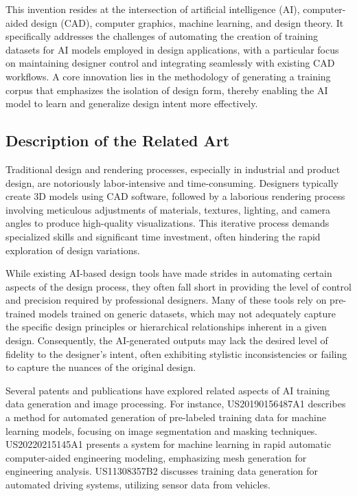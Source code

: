 \documentclass{article}
\begin{document}
This invention resides at the intersection of artificial intelligence (AI), computer-aided design (CAD), computer graphics, machine learning, and design theory. It specifically addresses the challenges of automating the creation of training datasets for AI models employed in design applications, with a particular focus on maintaining designer control and integrating seamlessly with existing CAD workflows. A core innovation lies in the methodology of generating a training corpus that emphasizes the isolation of design form, thereby enabling the AI model to learn and generalize design intent more effectively.



\subsection{Description of the Related Art}

Traditional design and rendering processes, especially in industrial and product design, are notoriously labor-intensive and time-consuming. Designers typically create 3D models using CAD software, followed by a laborious rendering process involving meticulous adjustments of materials, textures, lighting, and camera angles to produce high-quality visualizations. This iterative process demands specialized skills and significant time investment, often hindering the rapid exploration of design variations.

While existing AI-based design tools have made strides in automating certain aspects of the design process, they often fall short in providing the level of control and precision required by professional designers. Many of these tools rely on pre-trained models trained on generic datasets, which may not adequately capture the specific design principles or hierarchical relationships inherent in a given design. Consequently, the AI-generated outputs may lack the desired level of fidelity to the designer's intent, often exhibiting stylistic inconsistencies or failing to capture the nuances of the original design.

Several patents and publications have explored related aspects of AI training data generation and image processing. For instance, US20190156487A1 describes a method for automated generation of pre-labeled training data for machine learning models, focusing on image segmentation and masking techniques. US20220215145A1 presents a system for machine learning in rapid automatic computer-aided engineering modeling, emphasizing mesh generation for engineering analysis. US11308357B2 discusses training data generation for automated driving systems, utilizing sensor data from vehicles.
\end{document}
